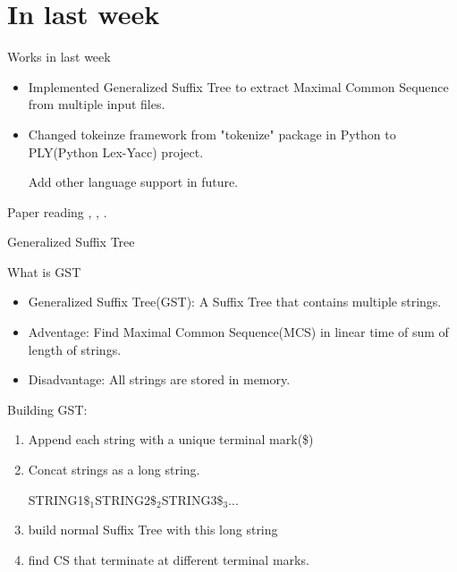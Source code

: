 
\section{In last week} 

\begin{frame}{Works in last week}

\begin{itemize}
\item Implemented Generalized Suffix Tree to extract 
Maximal Common Sequence from multiple input files.
\item Changed tokeinze framework from "tokenize" package in Python to
PLY(Python Lex-Yacc) project.

Add other language support in future.
\end{itemize}

Paper reading \cite{roy2007survey}, \cite{rainer2008using},
      \cite{smith2009detecting}.



\end{frame}


\begin{frame}{Generalized Suffix Tree}

\transfade
What is GST


\begin{itemize}
\item Generalized Suffix Tree(GST): 
    A Suffix Tree that contains multiple strings.

\item Adventage: Find Maximal Common Sequence(MCS) in linear time of 
sum of length of strings.
\item Disadvantage: All strings are stored in memory.
\end{itemize}

\pause
Building GST:
\begin{enumerate}
\item Append each string with a unique terminal mark(\$)
\item Concat strings as a long string. 

STRING1\alert{$\$_1$}STRING2\alert{$\$_2$}STRING3\alert{$\$_3$}...
\item build normal Suffix Tree with this long string
\item find CS that terminate at different terminal marks.
\end{enumerate}

\end{frame}

